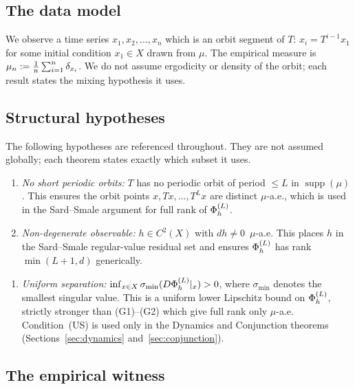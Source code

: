 \subsection{The data model}

We observe a time series $x_1, x_2, \ldots, x_n$ which is an orbit segment of
$T$: $x_i = T^{i-1}x_1$ for some initial condition $x_1 \in X$ drawn from
$\mu$.
The empirical measure is $\mu_n := \frac{1}{n}\sum_{i=1}^n \delta_{x_i}$.
We do not assume ergodicity or density of the orbit; each result states the
mixing hypothesis it uses.

\subsection{Structural hypotheses}

The following hypotheses are referenced throughout.
They are not assumed globally; each theorem states exactly which subset it uses.

\begin{enumerate}[label=(G\arabic*)]
  \item \emph{No short periodic orbits:}
    $T$ has no periodic orbit of period $\leq L$ in $\operatorname{supp}(\mu)$.
    This ensures the orbit points $x, Tx, \ldots, T^L x$ are distinct
    $\mu$-a.e., which is used in the Sard--Smale argument for full rank of
    $\Phi_h^{(L)}$.

  \item \emph{Non-degenerate observable:}
    $h \in C^2(X)$ with $dh \neq 0$~$\mu$-a.e.
    This places $h$ in the Sard--Smale regular-value residual set and
    ensures $\Phi_h^{(L)}$ has rank $\min(L+1,d)$ generically.
\end{enumerate}

\begin{enumerate}[label=(US)]
  \item \emph{Uniform separation:}
    $\inf_{x \in X} \sigma_{\min}(D\Phi_h^{(L)}|_x) > 0$,
    where $\sigma_{\min}$ denotes the smallest singular value.
    This is a uniform lower Lipschitz bound on $\Phi_h^{(L)}$, strictly stronger than
    (G1)--(G2) which give full rank only $\mu$-a.e.
    Condition~(US) is used only in the Dynamics and Conjunction theorems
    (Sections~\ref{sec:dynamics} and~\ref{sec:conjunction}).
\end{enumerate}

\subsection{The empirical witness}

